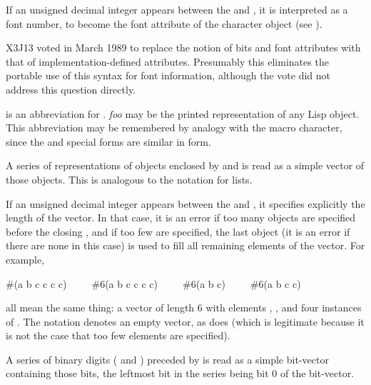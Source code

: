 \begin{flushdesc}
\begin{obsolete}
If an unsigned decimal integer appears between the \cd{\#} and \cd{{\Xbackslash}},
it is interpreted as a font number, to become the font attribute
of the character object (see ).
\end{obsolete}

\begin{newer}
X3J13 voted in March 1989 
to replace the notion of bits and font attributes with
that of implementation-defined attributes.  Presumably
this eliminates the portable use of this syntax for font information,
although the vote did not address this question directly.
\end{newer}

\item[\cd{\#'}]
 is an abbreviation for .
\emph{foo} may be the printed representation of any Lisp object.
This abbreviation may be remembered by analogy with the 
macro character, since the  and  special forms are
similar in form.

\item[\cd{\#(}]
A series of representations of objects enclosed by \cd{\#(} and \cd{)}
is read as a simple vector of those objects.  This is analogous to
the notation for lists.

If an unsigned decimal integer appears between the \cd{\#} and \cd{(},
it specifies explicitly the length of the vector.  In that case,
it is an error if too many objects are specified before the closing \cd{)},
and if too few are specified, the last object
(it is an error if there are none in this case)
is used to fill all
remaining elements of the vector.
For example,
\begin{lisp}
\#(a b c c c c)~~~~~\#6(a b c c c c)~~~~~\#6(a b c)~~~~~\#6(a b c c)
\end{lisp}
all mean the same thing: a vector of length 6 with elements , ,
and four instances of .  
The notation \cd{\#()} denotes an empty vector, as does 
(which is legitimate because it is not the case that too few elements
are specified).

\item[\cd{\#*}]
A series of binary digits ( and ) preceded by \cd{\#*} is
read as a simple bit-vector containing those bits, the leftmost bit
in the series being bit 0 of the bit-vector.


\end{flushdesc}
